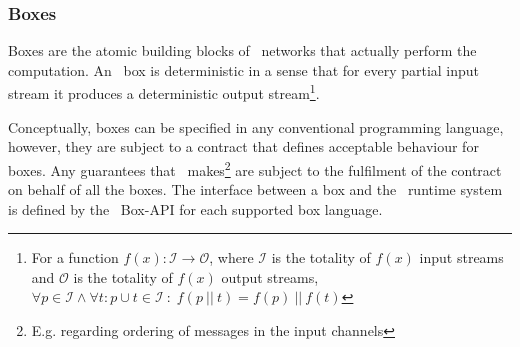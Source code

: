     \subsubsection{Boxes}
Boxes are the atomic building blocks of \ak\ networks that actually perform the computation. An \ak\ box is deterministic in a sense that for every partial input stream it produces a deterministic output stream\footnote{For a function $f(x): \mathcal{I} \to \mathcal{O}$, where $\mathcal{I}$ is the totality of $f(x)$ input streams and $\mathcal{O}$ is the totality of $f(x)$ output streams, $\forall p \in \mathcal{I} \land \forall t:p \cup t \in \mathcal{I} \: : \; f(p \:||\: t) = f(p) \:||\: f(t)$}.

Conceptually, boxes can be specified in any conventional programming language, however, they are subject to a contract that defines acceptable behaviour for boxes. Any guarantees that \ak\ makes\footnote{E.g. regarding ordering of messages in the input channels} are subject to the fulfilment of the contract on behalf of all the boxes. The interface between a box and the \ak\ runtime system is defined by the \ak\ Box-API for each supported box language.

